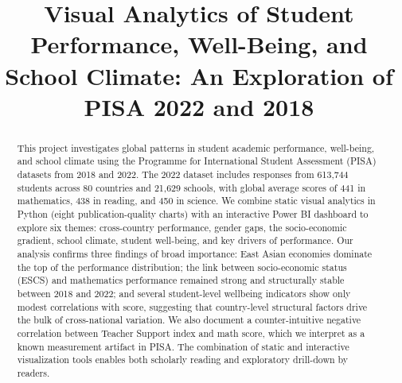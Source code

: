 \documentclass[conference]{IEEEtran}
\begin{document}
\title{Visual Analytics of Student Performance, Well-Being, and School Climate: An Exploration of PISA 2022 and 2018}

\author{
}

\maketitle

\begin{abstract}
This project investigates global patterns in student academic performance, well-being, and school climate using the Programme for International Student Assessment (PISA) datasets from 2018 and 2022. The 2022 dataset includes responses from 613{,}744 students across 80 countries and 21{,}629 schools, with global average scores of 441 in mathematics, 438 in reading, and 450 in science. We combine static visual analytics in Python (eight publication-quality charts) with an interactive Power BI dashboard to explore six themes: cross-country performance, gender gaps, the socio-economic gradient, school climate, student well-being, and key drivers of performance. Our analysis confirms three findings of broad importance: East Asian economies dominate the top of the performance distribution; the link between socio-economic status (ESCS) and mathematics performance remained strong and structurally stable between 2018 and 2022; and several student-level wellbeing indicators show only modest correlations with score, suggesting that country-level structural factors drive the bulk of cross-national variation. We also document a counter-intuitive negative correlation between Teacher Support index and math score, which we interpret as a known measurement artifact in PISA. The combination of static and interactive visualization tools enables both scholarly reading and exploratory drill-down by readers.
\end{abstract}
\end{document}
